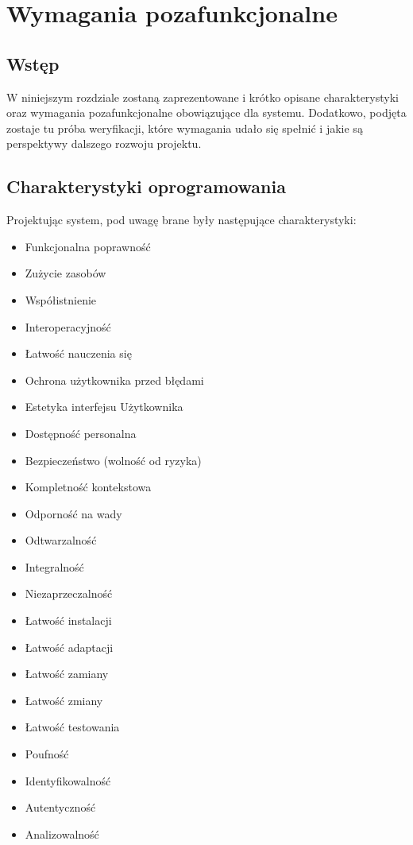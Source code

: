 \chapter{Wymagania pozafunkcjonalne}
\label{Chapter4}

\section{Wstęp}
\label{Chapter41}

W niniejszym rozdziale zostaną zaprezentowane i krótko opisane charakterystyki oraz wymagania pozafunkcjonalne obowiązujące dla systemu. Dodatkowo, podjęta zostaje tu próba weryfikacji, które wymagania udało się spełnić i jakie są perspektywy dalszego rozwoju projektu.

\section{Charakterystyki oprogramowania}
\label{Chapter42}

Projektując system, pod uwagę brane były następujące charakterystyki:

\begin{itemize}
\item{Funkcjonalna poprawność}
\item{Zużycie zasobów}
\item{Współistnienie}
\item{Interoperacyjność}
\item{Łatwość nauczenia się}
\item{Ochrona użytkownika przed błędami}
\item{Estetyka interfejsu Użytkownika}
\item{Dostępność personalna}
\item{Bezpieczeństwo (wolność od ryzyka)}
\item{Kompletność kontekstowa}
\item{Odporność na wady}
\item{Odtwarzalność}
\item{Integralność}
\item{Niezaprzeczalność}
\item{Łatwość instalacji}
\item{Łatwość adaptacji}
\item{Łatwość zamiany}
\item{Łatwość zmiany}
\item{Łatwość testowania}
\item{Poufność}
\item{Identyfikowalność}
\item{Autentyczność}
\item{Analizowalność}
\end{itemize}

